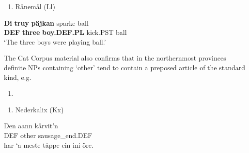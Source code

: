 \begin{enumerate} %
\item 
Rånemål (Ll)

\end{enumerate} %
\ea\label{}
\gll \textbf{Di} \textbf{truy} \textbf{päjkan} sparke  ball\\


\textbf{DEF} \textbf{three} \textbf{boy.DEF.PL} kick.PST  ball\\ %


‘The three boys were playing ball.’
\z


The Cat Corpus material also confirms that in the northernmost provinces definite NPs containing ‘other’ tend to contain a preposed article of the standard kind, e.g. 

\begin{enumerate} %
\item 
\end{enumerate} %
\setcounter{listLFOxcviiileveli}{0}
\begin{enumerate} %
\item 
Nederkalix (Kx)

\end{enumerate} %
Den  aann  kårvit’n\\


DEF  other  sausage\_end.DEF\\ %


\ea\label{}
\gll har  ‘a  meste  tåppe  ein  ini  öre.\\


